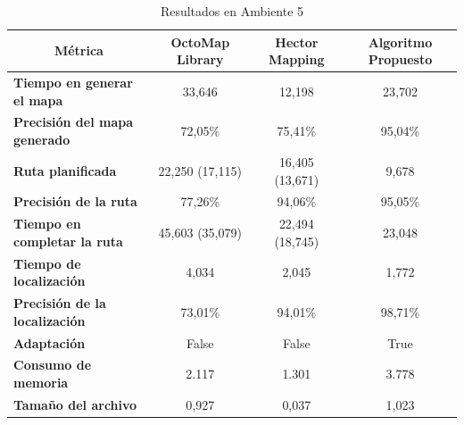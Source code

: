 \begin{table}[H]
\centering
\begin{tabular}{@{}lccc@{}}
\toprule
\multicolumn{1}{|c|}{\textbf{Métrica}} &
  \multicolumn{1}{c|}{\textbf{OctoMap Library}} &
  \multicolumn{1}{c|}{\textbf{Hector Mapping}} &
  \multicolumn{1}{c|}{\textbf{Algoritmo Propuesto}} \\ \midrule
\multicolumn{1}{|l|}{\textbf{Tiempo en generar el mapa}}    & \multicolumn{1}{c|}{33,646} & \multicolumn{1}{c|}{12,198} & \multicolumn{1}{c|}{23,702} \\ \midrule
\multicolumn{1}{|l|}{\textbf{Precisión del mapa generado}}  & \multicolumn{1}{c|}{72,05\%} & \multicolumn{1}{c|}{75,41\%} & \multicolumn{1}{c|}{95,04\%} \\ \midrule
\multicolumn{1}{|l|}{\textbf{Ruta planificada}}             & \multicolumn{1}{c|}{22,250 (17,115)} & \multicolumn{1}{c|}{ 16,405 (13,671) } & \multicolumn{1}{c|}{9,678} \\ \midrule
\multicolumn{1}{|l|}{\textbf{Precisión de la ruta}}         & \multicolumn{1}{c|}{77,26\%} & \multicolumn{1}{c|}{94,06\%} & \multicolumn{1}{c|}{95,05\%} \\ \midrule
\multicolumn{1}{|l|}{\textbf{Tiempo en completar la ruta}}  & \multicolumn{1}{c|}{45,603 (35,079)} & \multicolumn{1}{c|}{22,494 (18,745)} & \multicolumn{1}{c|}{23,048} \\ \midrule
\multicolumn{1}{|l|}{\textbf{Tiempo de localización}}       & \multicolumn{1}{c|}{4,034} & \multicolumn{1}{c|}{2,045} & \multicolumn{1}{c|}{1,772} \\ \midrule
\multicolumn{1}{|l|}{\textbf{Precisión de la localización}} & \multicolumn{1}{c|}{73,01\%} & \multicolumn{1}{c|}{94,01\%} & \multicolumn{1}{c|}{98,71\%} \\ \midrule
\multicolumn{1}{|l|}{\textbf{Adaptación}}                   & \multicolumn{1}{c|}{False} & \multicolumn{1}{c|}{False} & \multicolumn{1}{c|}{True} \\ \midrule
\multicolumn{1}{|l|}{\textbf{Consumo de memoria}}           & \multicolumn{1}{c|}{2.117} & \multicolumn{1}{c|}{1.301} & \multicolumn{1}{c|}{3.778} \\ \midrule
\multicolumn{1}{|l|}{\textbf{Tamaño del archivo}}           & \multicolumn{1}{c|}{0,927} & \multicolumn{1}{c|}{0,037} & \multicolumn{1}{c|}{1,023} \\ \bottomrule
\end{tabular}
\caption{Resultados en Ambiente 5}
\label{tab:resultados_ambiente_5}
\end{table}

